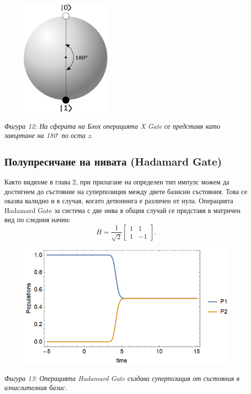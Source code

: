     \begin{figure}[H]
        \centering
        \includegraphics[width=130pt]{14.png}
    \end{figure}
    \begin{center}
        \small \textit{Фигура 12: На сферата на Блох операцията X Gate се представя като завъртане на 180$^\circ$ по оста z.}
    \end{center}

    \nocite{nielsen2001quantum}

    \subsection{Полупресичане на нивата (Hadamard Gate)}

    Както видяхме в глава 2, при прилагане на определен тип импулс можем да достигнем до състояние на суперпозиция между двете базисни състояния.
    Това се оказва валидно и в случая, когато детюнинга е различен от нула. Операцията Hadamard Gate за система с две нива в общия случай се представя
    в матричен вид по следния начин:
    \begin{equation}
        H = \frac{1}{\sqrt{2}} \begin{bmatrix}
            1 & 1\\
            1 & -1
        \end{bmatrix}.
    \end{equation}

    \begin{figure}[H]
        \centering
        \includegraphics[width=370pt]{21.png}
    \end{figure}
    \begin{center}
        \small \textit{Фигура 13: Операцията Hadamard Gate създава суперпозиция от състояния в изчислителния базис.}
    \end{center}


